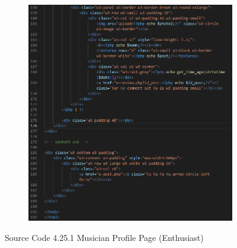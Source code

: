 \begin{enumerate}[1.]
\begin{figure}[h]
\begin{subfigure}[b]{0.6\textwidth}
            \label{fig:sub1}
        \end{subfigure}
        \hspace{0.04\textwidth}
        \begin{subfigure}[b]{0.7\textwidth}
            \centering
            \includegraphics[width=\textwidth]{mainmatter/images/frontend/code/emprofile2.png}
            \label{fig:sub2}
        \end{subfigure}
        \caption*{Source Code 4.25.1 Musician Profile Page (Enthusiast)}
        \label{fig:myfig64a}
    \end{figure}


\end{enumerate}
